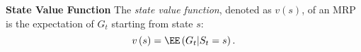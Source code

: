 \documentclass[RL]{subfiles}
\begin{document}
    \begin{definition}{\textbf{State Value Function}}
        The \emph{state value function}, denoted as $v\left( s \right)$, of an MRP is the expectation of $G_t$ starting from state $s$:
        \begin{equation*}
            v\left( s \right) = \EE\left( G_t|S_t=s \right).
        \end{equation*}
    \end{definition}



































    
    
    
\end{document}
